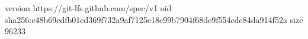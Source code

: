 version https://git-lfs.github.com/spec/v1
oid sha256:c48b69edfb01cd369f732a9af7125e18c99b7904f68de9f554cde84da914f52a
size 96233
